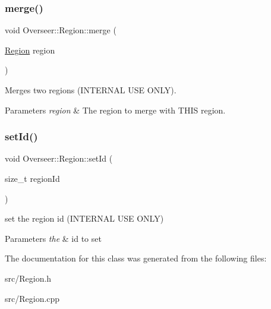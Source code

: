 \subsubsection{\texorpdfstring{merge()}{merge()}}
{\footnotesize\ttfamily void Overseer\+::\+Region\+::merge (\begin{DoxyParamCaption}\item[{\hyperlink{classOverseer_1_1Region}{Region}}]{region }\end{DoxyParamCaption})}



Merges two regions (I\+N\+T\+E\+R\+N\+AL U\+SE O\+N\+LY). 


\begin{DoxyParams}{Parameters}
{\em region} & The region to merge with T\+H\+IS region. \\
\hline
\end{DoxyParams}
\mbox{\label{classOverseer_1_1Region_a52fa1e6684d036d9f2761ec4cf85cd62}} 
\subsubsection{\texorpdfstring{set\+Id()}{setId()}}
{\footnotesize\ttfamily void Overseer\+::\+Region\+::set\+Id (\begin{DoxyParamCaption}\item[{size\+\_\+t}]{region\+Id }\end{DoxyParamCaption})}



set the region id (I\+N\+T\+E\+R\+N\+AL U\+SE O\+N\+LY) 


\begin{DoxyParams}{Parameters}
{\em the} & id to set \\
\hline
\end{DoxyParams}


The documentation for this class was generated from the following files\+:\begin{DoxyCompactItemize}
\item 
src/Region.\+h\item 
src/Region.\+cpp\end{DoxyCompactItemize}
